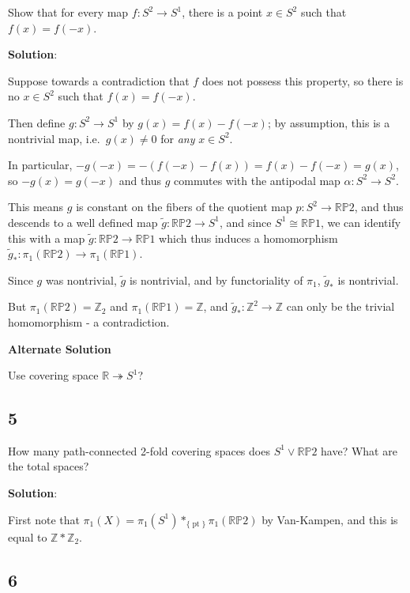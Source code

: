 Show that for every map \(f: S^2 \to S^1\), there is a point
\(x\in S^2\) such that \(f(x) = f(-x)\).

\textbf{Solution}:

Suppose towards a contradiction that \(f\) does not possess this
property, so there is no \(x\in S^2\) such that \(f(x) = f(-x)\).

Then define \(g: S^2 \to S^1\) by \(g(x) = {f(x) - f(-x)}\); by
assumption, this is a nontrivial map, i.e.~\(g(x) \neq 0\) for
\emph{any} \(x\in S^2\).

In particular, \(-g(-x) = -{(f(-x) - f(x))} = {f(x) - f(-x)} = g(x)\),
so \(-g(x) = g(-x)\) and thus \(g\) commutes with the antipodal map
\(\alpha: S^2 \to S^2\).

This means \(g\) is constant on the fibers of the quotient map
\(p: S^2 \to{\mathbb{RP}}2\), and thus descends to a well defined map
\(\tilde g: {\mathbb{RP}}2 \to S^1\), and since
\(S^1 \cong {\mathbb{RP}}1\), we can identify this with a map
\(\tilde g: {\mathbb{RP}}2 \to{\mathbb{RP}}1\) which thus induces a
homomorphism
\(\tilde g_*: \pi_1({\mathbb{RP}}2) \to \pi_1({\mathbb{RP}}1)\).

Since \(g\) was nontrivial, \(\tilde g\) is nontrivial, and by
functoriality of \(\pi_1\), \(\tilde g_*\) is nontrivial.

But \(\pi_1({\mathbb{RP}}2) = {\mathbb{Z}}_2\) and
\(\pi_1({\mathbb{RP}}1) = {\mathbb{Z}}\), and
\(\tilde g_*: {\mathbb{Z}}^2 \to{\mathbb{Z}}\) can only be the trivial
homomorphism - a contradiction.

\textbf{Alternate Solution}

Use covering space \({\mathbb{R}}\twoheadrightarrow S^1\)?

\hypertarget{section-18}{%
\subsection{5}\label{section-18}}

How many path-connected 2-fold covering spaces does
\(S^1 \vee {\mathbb{RP}}2\) have? What are the total spaces?

\textbf{Solution}:

First note that
\(\pi_1(X) = \pi_1(S^1) \ast_{{\{\operatorname{pt}\}}} \pi_1({\mathbb{RP}}2)\)
by Van-Kampen, and this is equal to \({\mathbb{Z}}\ast {\mathbb{Z}}_2\).

\hypertarget{section-19}{%
\subsection{6}\label{section-19}}

